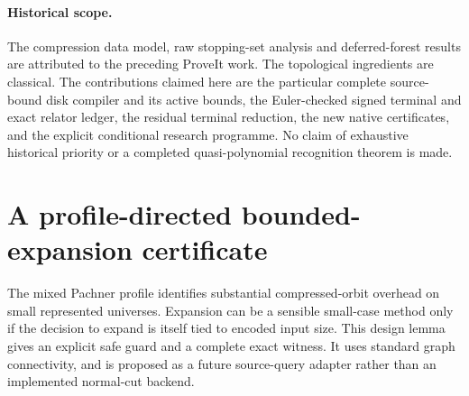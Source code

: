 \paragraph{Historical scope.}
The compression data model, raw stopping-set analysis and deferred-forest
results are attributed to the preceding ProveIt work. The topological ingredients
are classical. The contributions claimed here are the particular complete
source-bound disk compiler and its active bounds, the Euler-checked signed
terminal and exact relator ledger, the residual terminal reduction, the new
native certificates, and the explicit conditional research programme. No claim
of exhaustive historical priority or a completed quasi-polynomial recognition
theorem is made.

\section{A profile-directed bounded-expansion certificate}
\label{sec:bounded-expansion}

The mixed Pachner profile identifies substantial compressed-orbit overhead on
small represented universes. Expansion can be a sensible small-case method
only if the decision to expand is itself tied to encoded input size. This
design lemma gives an explicit safe guard and a complete exact witness. It
uses standard graph connectivity, and is proposed as a future source-query
adapter rather than an implemented normal-cut backend.

